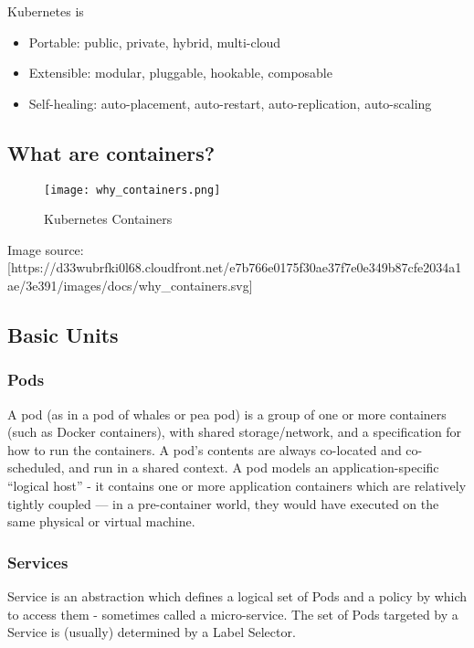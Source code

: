 Kubernetes is

\begin{itemize}

\item
  Portable: public, private, hybrid, multi-cloud
\item
  Extensible: modular, pluggable, hookable, composable
\item
  Self-healing: auto-placement, auto-restart, auto-replication,
  auto-scaling
\end{itemize}

\subsection{What are containers?}\label{what-are-containers}

\begin{figure}[htbp]
\centering
\texttt{[image: why\_containers.png]}
\caption{Kubernetes Containers}
\end{figure}

Image source:
{[}https://d33wubrfki0l68.cloudfront.net/e7b766e0175f30ae37f7e0e349b87cfe2034a1ae/3e391/images/docs/why\_containers.svg{]}

\subsection{Basic Units}\label{basic-units}

\subsubsection{Pods}\label{pods}

A pod (as in a pod of whales or pea pod) is a group of one or more
containers (such as Docker containers), with shared storage/network, and
a specification for how to run the containers. A pod's contents are
always co-located and co-scheduled, and run in a shared context. A pod
models an application-specific ``logical host'' - it contains one or
more application containers which are relatively tightly coupled --- in
a pre-container world, they would have executed on the same physical or
virtual machine.

\subsubsection{Services}\label{services}

Service is an abstraction which defines a logical set of Pods and a
policy by which to access them - sometimes called a micro-service. The
set of Pods targeted by a Service is (usually) determined by a Label
Selector.

